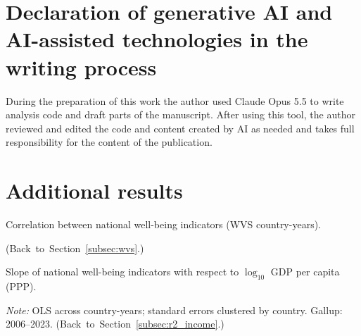 \documentclass[12pt]{article}
\begin{document}
\clearpage
\section*{Declaration of generative AI and AI-assisted technologies in the writing process}
During the preparation of this work the author used Claude Opus 5.5 to write analysis code and draft parts of the manuscript. After using this tool, the author reviewed and edited the code and content created by AI as needed and takes full responsibility for the content of the publication.




\clearpage
\appendix
\section{Additional results}\label{app:additional}
\renewcommand{\thetable}{A\arabic{table}}
\renewcommand{\thefigure}{A\arabic{figure}}
\setcounter{table}{0}
\setcounter{figure}{0}

\begin{table}[htbp]
    \centering
    \caption{Correlation between national well-being indicators (WVS country-years).}\label{tab:correlation}
    \begin{adjustbox}{max width=\textwidth}
    
    \end{adjustbox}
    \begin{minipage}{\textwidth}\footnotesize \hfill(Back~to~Section~\ref{subsec:wvs}.)\end{minipage}
\end{table}

\begin{table}[htbp]
    \centering
    \caption{Slope of national well-being indicators with respect to $\log_{10}$ GDP per capita (PPP).}\label{tab:slopes}
    \begin{adjustbox}{max width=\textwidth}
    
    \end{adjustbox}
    \begin{minipage}{\textwidth}\footnotesize \textit{Note:} OLS across country-years; standard errors clustered by country. Gallup: 2006--2023. \hfill(Back~to~Section~\ref{subsec:r2_income}.)\end{minipage}
\end{table}
\end{document}
